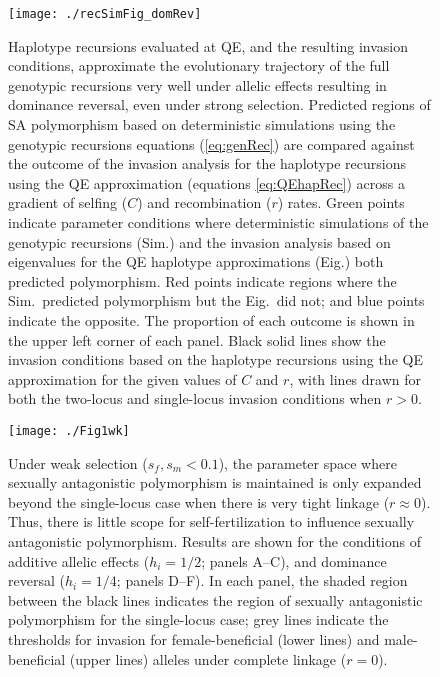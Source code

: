 \documentclass{article}
\begin{document}
\begin{figure}[H] 
\texttt{[image: ./recSimFig\_domRev]}
\caption{Haplotype recursions evaluated at QE, and the resulting invasion conditions, approximate the evolutionary trajectory of the full genotypic recursions very well under allelic effects resulting in dominance reversal, even under strong selection. Predicted regions of SA polymorphism based on deterministic simulations using the genotypic recursions equations (\ref{eq:genRec}) are compared against the outcome of the invasion analysis for the haplotype recursions using the QE approximation (equations \ref{eq:QEhapRec}) across a gradient of selfing ($C$) and recombination ($r$) rates. Green points indicate parameter conditions where deterministic simulations of the genotypic recursions (Sim.) and the invasion analysis based on eigenvalues for the QE haplotype approximations (Eig.) both predicted polymorphism. Red points indicate regions where the Sim.~predicted polymorphism but the Eig.~did not; and blue points indicate the opposite. The proportion of each outcome is shown in the upper left corner of each panel. Black solid lines show the invasion conditions based on the haplotype recursions using the QE approximation for the given values of $C$ and $r$, with lines drawn for both the two-locus and single-locus invasion conditions when $r > 0$.}
\label{fig:domRevSim}
\end{figure}
\newpage{}


\begin{figure}[H]
\texttt{[image: ./Fig1wk]}
\caption{Under weak selection ($s_f,s_m < 0.1$), the parameter space where sexually antagonistic polymorphism is maintained is only expanded beyond the single-locus case when there is very tight linkage ($r \approx 0$). Thus, there is little scope for self-fertilization to influence sexually antagonistic polymorphism. Results are shown for the conditions of additive allelic effects ($h_i = 1/2$; panels A--C), and dominance reversal ($h_i = 1/4$; panels D--F). In each panel, the shaded region between the black lines indicates the region of sexually antagonistic polymorphism for the single-locus case; grey lines indicate the thresholds for invasion for female-beneficial (lower lines) and male-beneficial (upper lines) alleles under complete linkage ($r = 0$).}
\label{fig:wkFunnelPlots}
\end{figure}
\newpage{}
\end{document}
